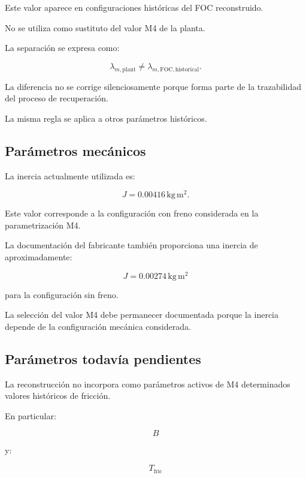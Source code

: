 Este valor aparece en configuraciones históricas del FOC reconstruido.

No se utiliza como sustituto del valor M4 de la planta.

La separación se expresa como:

\begin{equation}
\lambda_{m,\mathrm{plant}}
\neq
\lambda_{m,\mathrm{FOC,historical}}.
\end{equation}

La diferencia no se corrige silenciosamente porque forma parte de la trazabilidad del proceso de recuperación.

La misma regla se aplica a otros parámetros históricos.

\subsection{Parámetros mecánicos}

La inercia actualmente utilizada es:

\begin{equation}
J=0.00416\,\mathrm{kg\,m^2}.
\end{equation}

Este valor corresponde a la configuración con freno considerada en la parametrización M4.

La documentación del fabricante también proporciona una inercia de aproximadamente:

\begin{equation}
J=0.00274\,\mathrm{kg\,m^2}
\end{equation}

para la configuración sin freno.

La selección del valor M4 debe permanecer documentada porque la inercia depende de la configuración mecánica considerada.

\subsection{Parámetros todavía pendientes}

La reconstrucción no incorpora como parámetros activos de M4 determinados valores históricos de fricción.

En particular:

\begin{equation}
B
\end{equation}

y:

\begin{equation}
T_{\mathrm{fric}}
\end{equation}

